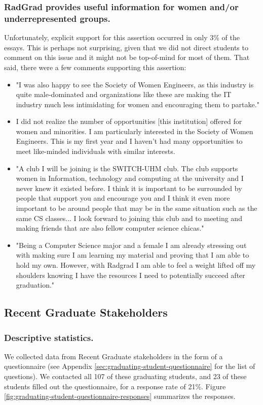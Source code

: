\documentclass[acmsmall,nonacm]{acmart}
\begin{document}
\subsubsection{RadGrad provides useful information for women and/or underrepresented groups.} Unfortunately, explicit support for this assertion occurred in only 3\% of the essays. This is perhaps not surprising, given that we did not direct students to comment on this issue and it might not be top-of-mind for most of them. That said, there were a few comments supporting this assertion:

\begin{itemize}[leftmargin=*]
\item "I was also happy to see the Society of Women Engineers, as this industry is quite male-dominated and organizations like these are making the IT industry much less intimidating for women and encouraging them to partake."
\item I did not realize the number of opportunities [this institution] offered for women and minorities. I am particularly interested in the Society of Women Engineers. This is my first year and I haven't had many opportunities to meet like-minded individuals with similar interests.
\item "A club I will be joining is the SWITCH-UHM club. The club supports women in Information, technology and computing at the university and I never knew it existed before. I think it is important to be surrounded by people that support you and encourage you and I think it even more important to be around people that may be in the same situation such as the same CS classes... I look forward to joining this club and to meeting and making friends that are also fellow computer science chicas."
\item "Being a Computer Science major and a female I am already stressing out with making sure I am learning my material and proving that I am able to hold my own. However, with Radgrad I am able to feel a weight lifted off my shoulders knowing I have the resources I need to potentially succeed after graduation."
\end{itemize}

\subsection{Recent Graduate Stakeholders}

\subsubsection{Descriptive statistics.} We collected data from Recent Graduate stakeholders in the form of a questionnaire (see Appendix \ref{sec:graduating-student-questionnaire} for the list of questions). We contacted all 107 of these graduating students, and 23 of these students filled out the questionnaire, for a response rate of 21\%.  Figure \ref{fig:graduating-student-questionnaire-responses} summarizes the responses.
\end{document}

